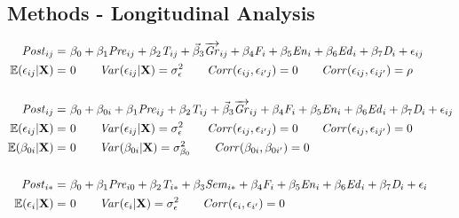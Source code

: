 \documentclass[a0,landscape]{a0poster}
\begin{document}
\begin{multicols}{3}
\subsection*{Methods - Longitudinal Analysis}

\begin{align}
\mathit{Post}_{ij} = & ~ \beta_0 
                     + \beta_1 \mathit{Pre}_{ij}
                     + \beta_2 \mathit{T}_{ij}
                     + \vec\beta_{3} \overrightarrow{\mathit{Gr}}_{ij}
                     + \beta_4 \mathit{F}_{i}
                     + \beta_5 \mathit{En}_{i}
                     + \beta_6 \mathit{Ed}_{i}
                     + \beta_7 \mathit{D}_{i}
                     + \epsilon_{ij}
                     \label{eq:model1} \\
\mathbb{E}(\epsilon_{ij} | \mathbf{X} ) = & ~ 0 \nonumber \qquad
\mathit{Var}(\epsilon_{ij} | \mathbf{X} ) = \sigma^2_{\epsilon} \qquad
                    \mathit{Corr}(\epsilon_{ij}, \epsilon_{i'j}) = 0 \qquad
                    \mathit{Corr}(\epsilon_{ij}, \epsilon_{ij'}) = \rho \nonumber \\
\nonumber \\
\mathit{Post}_{ij} = & ~ \beta_0 + \beta_{0i}
                     + \beta_1 \mathit{Pre}_{ij}
                     + \beta_2 \mathit{T}_{ij}
                     + \vec\beta_{3} \overrightarrow{\mathit{Gr}}_{ij}
                     + \beta_4 \mathit{F}_{i}
                     + \beta_5 \mathit{En}_{i}
                     + \beta_6 \mathit{Ed}_{i}
                     + \beta_7 \mathit{D}_{i}
                     + \epsilon_{ij}
                     \label{eq:model2} \\
\mathbb{E}(\epsilon_{ij} | \mathbf{X} ) = & ~ 0 \nonumber \qquad
\mathit{Var}(\epsilon_{ij} | \mathbf{X} ) = \sigma^2_{\epsilon} \qquad
                    \mathit{Corr}(\epsilon_{ij}, \epsilon_{i'j}) = 0 \qquad
                    \mathit{Corr}(\epsilon_{ij}, \epsilon_{ij'}) = 0 \nonumber \\
\mathbb{E}(\beta_{0i} | \mathbf{X} ) = & ~ 0 \nonumber \qquad
\mathit{Var}(\beta_{0i} | \mathbf{X} ) = \sigma^2_{\beta_0} \qquad
                    \mathit{Corr}(\beta_{0i}, \beta_{0i'}) = 0 \nonumber \\
\nonumber \\
\mathit{Post}_{i*} = & ~ \beta_0
                     + \beta_1 \mathit{Pre}_{i0}
                     + \beta_2 \mathit{T}_{i*}
                     + \beta_3 \mathit{Sem}_{i*}
                     + \beta_4 \mathit{F}_{i}
                     + \beta_5 \mathit{En}_{i}
                     + \beta_6 \mathit{Ed}_{i}
                     + \beta_7 \mathit{D}_{i}
                     + \epsilon_{i}
                     \label{eq:model3} \\
\mathbb{E}(\epsilon_{i} | \mathbf{X} ) = & ~ 0 \nonumber \qquad
\mathit{Var}(\epsilon_{i} | \mathbf{X} ) = \sigma^2_{\epsilon} \qquad
                    \mathit{Corr}(\epsilon_{i}, \epsilon_{i'}) = 0  \nonumber
\end{align} 


\end{multicols}
\end{document}
